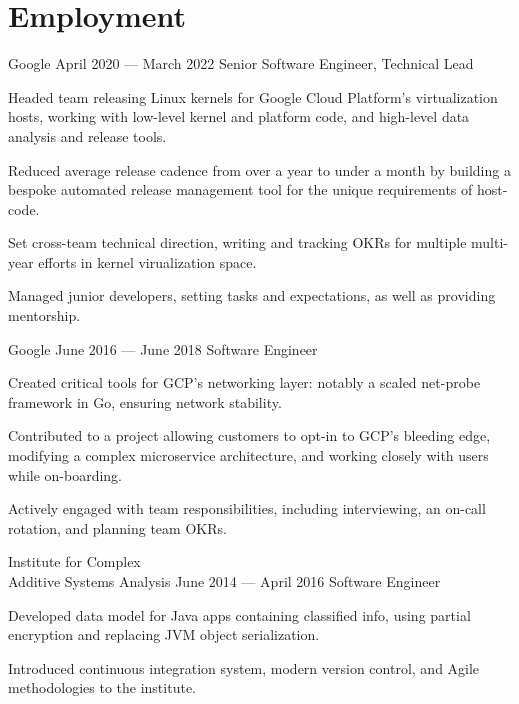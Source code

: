 \documentclass{tc_cv}
\newcommand{\jobSpace}{\vspace{0.75em}}
\begin{document}
\begin{minipage}[t]{0.6\linewidth}
  \section{Employment}
  \begin{job}{Google}
    {April 2020 --- March 2022}
    {Senior Software Engineer, Technical Lead}
    \item Headed team releasing Linux kernels for Google Cloud Platform's
      virtualization hosts, working with low-level kernel and platform code,
      and high-level data analysis and release tools.
    \item Reduced average release cadence from over a year to under a month
      by building a bespoke automated release management tool for the unique
      requirements of host-code.
    \item Set cross-team technical direction, writing and tracking OKRs for
      multiple multi-year efforts in kernel virualization space.
    \item Managed junior developers, setting tasks and expectations, as well as
      providing mentorship.
  \end{job}
  \jobSpace
  \begin{job}{Google}
    {June 2016 --- June 2018}
    {Software Engineer}
  \item Created critical tools for GCP's networking layer: notably a scaled
    net-probe framework in Go, ensuring network stability.
  \item Contributed to a project allowing customers to opt-in to GCP's bleeding
    edge, modifying a complex microservice architecture, and working closely
    with users while on-boarding.
  \item Actively engaged with team responsibilities, including interviewing,
    an on-call rotation, and planning team OKRs.
  \end{job}
  \jobSpace
  \begin{job}{Institute for Complex \\ Additive Systems Analysis}
    {June 2014 --- April 2016}
    {Software Engineer}
    \item Developed data model for Java apps containing classified info,
      using partial encryption and replacing JVM object serialization.
    \item Introduced continuous integration system, modern version control, and
      Agile methodologies to the institute.
  \end{job}

\end{minipage}
\end{document}
